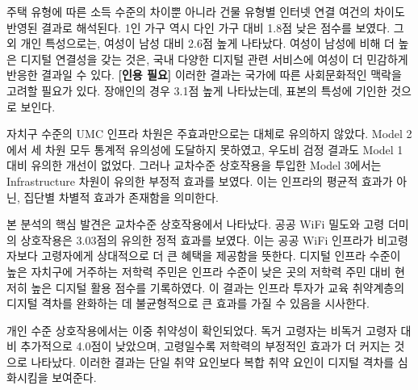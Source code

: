 주택 유형에 따른 소득 수준의 차이뿐 아니라 건물 유형별 인터넷 연결 여건의 차이도 반영된 결과로 해석된다. 1인 가구 역시 다인 가구 대비 1.8점 낮은 점수를 보였다. 그 외 개인 특성으로는, 여성이 남성 대비 2.6점 높게 나타났다. 여성이 남성에 비해 더 높은 디지털 연결성을 갖는 것은, 국내 다양한 디지털 관련 서비스에 여성이 더 민감하게 반응한 결과일 수 있다. \textbf{[인용 필요]} 이러한 결과는 국가에 따른 사회문화적인 맥락을 고려할 필요가 있다. 장애인의 경우 3.1점 높게 나타났는데, 표본의 특성에 기인한 것으로 보인다.

자치구 수준의 UMC 인프라 차원은 주효과만으로는 대체로 유의하지 않았다. Model 2에서 세 차원 모두 통계적 유의성에 도달하지 못하였고, 우도비 검정 결과도 Model 1 대비 유의한 개선이 없었다. 그러나 교차수준 상호작용을 투입한 Model 3에서는 Infrastructure 차원이 유의한 부정적 효과를 보였다. 이는 인프라의 평균적 효과가 아닌, 집단별 차별적 효과가 존재함을 의미한다.

본 분석의 핵심 발견은 교차수준 상호작용에서 나타났다. 공공 WiFi 밀도와 고령 더미의 상호작용은 3.03점의 유의한 정적 효과를 보였다. 이는 공공 WiFi 인프라가 비고령자보다 고령자에게 상대적으로 더 큰 혜택을 제공함을 뜻한다. 디지털 인프라 수준이 높은 자치구에 거주하는 저학력 주민은 인프라 수준이 낮은 곳의 저학력 주민 대비 현저히 높은 디지털 활용 점수를 기록하였다. 이 결과는 인프라 투자가 교육 취약계층의 디지털 격차를 완화하는 데 불균형적으로 큰 효과를 가질 수 있음을 시사한다.

개인 수준 상호작용에서는 이중 취약성이 확인되었다. 독거 고령자는 비독거 고령자 대비 추가적으로 4.0점이 낮았으며, 고령일수록 저학력의 부정적인 효과가 더 커지는 것으로 나타났다. 이러한 결과는 단일 취약 요인보다 복합 취약 요인이 디지털 격차를 심화시킴을 보여준다.

